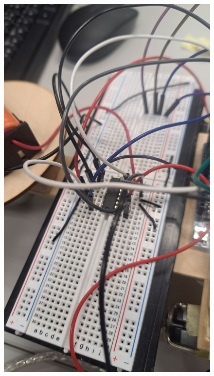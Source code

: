 \documentclass[a4paper,12pt]{./article}
\begin{document}
\begin{center}
\begin{figure}[H]
\begin{minipage}[t]{./0.45\textwidth}
\includegraphics[width=\textwidth]{./photos/f.jpg}
\end{minipage}
\hfill
\end{figure}\FloatBarrier\end{center}
\end{document}
